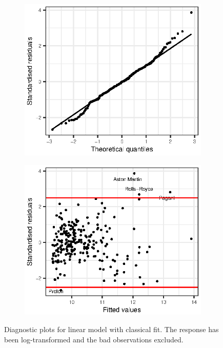 \documentclass[titlepage]{article}
\begin{document}
\begin{figure}[!htb]
  \begin{subfigure}{0.5\linewidth}
    \includegraphics{q3-qq-price-cat}
    \label{fig:q3-qq-resp-price-cat}
  \end{subfigure}
  \begin{subfigure}{0.5\linewidth}
    \includegraphics{q3-resids-vs-fitted-price-cat}
    \label{fig:q3-resids-vs-fitted-price-cat}
  \end{subfigure}
  \caption{Diagnostic plots for linear model with classical fit. The response has been log-transformed and the bad observations excluded.}
\end{figure}
\end{document}
